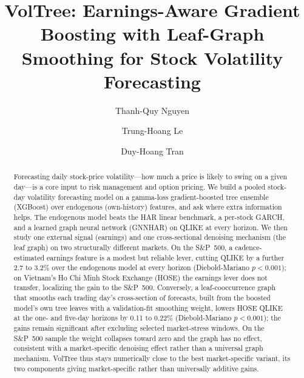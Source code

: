 \documentclass[runningheads,a4paper]{llncs}
\begin{document}
\title{VolTree: 
Earnings-Aware Gradient Boosting with Leaf-Graph Smoothing for Stock Volatility Forecasting}

\author{Thanh-Quy Nguyen \and Trung-Hoang Le \and Duy-Hoang Tran}


\maketitle
\pagestyle{empty}\thispagestyle{empty}   %

\begin{abstract}
Forecasting daily stock-price volatility---how much a price is likely to swing on a given day---is a core
input to risk management and option pricing. We build a pooled stock-day volatility forecasting model on a
gamma-loss gradient-boosted tree ensemble (XGBoost) over endogenous (own-history) features, and ask where
extra information helps. The endogenous model beats the HAR linear benchmark, a per-stock GARCH, and a learned graph neural network (GNNHAR) on QLIKE at every
horizon. We then study one external signal (earnings) and one cross-sectional denoising mechanism (the leaf
graph) on two structurally different markets. On the S\&P~500, a cadence-estimated earnings feature is a
modest but reliable lever,
cutting QLIKE by a further 2.7 to 3.2\% over the endogenous model at every horizon (Diebold-Mariano
$p<0.001$); on Vietnam's Ho Chi Minh Stock Exchange (HOSE) the earnings lever does not
transfer, localizing the gain to the S\&P~500. Conversely, a leaf-cooccurrence graph that smooths each trading day's
cross-section of forecasts, built from the boosted model's own tree leaves with a validation-fit smoothing
weight, lowers HOSE QLIKE at the one- and five-day horizons by 0.11 to 0.22\% (Diebold-Mariano $p<0.001$); the
gains remain significant after excluding selected market-stress windows. On the S\&P~500 sample the weight
collapses toward zero and the graph has no effect, consistent with a market-specific denoising effect
rather than a universal graph mechanism. VolTree thus stays numerically close to the best market-specific
variant, its two components giving market-specific rather than universally additive gains.
\end{abstract}
\end{document}
